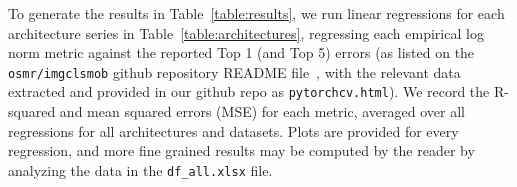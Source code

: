 To generate the results in Table~\ref{table:results}, we run linear regressions for each architecture series in Table~\ref{table:architectures}, regressing each empirical log norm metric against the reported Top 1 (and Top 5) errors (as listed on the \texttt{osmr/imgclsmob} github repository README file~\cite{osmr}, with the relevant data extracted and provided in our github repo as \texttt{pytorchcv.html}).
We record the R-squared and mean squared errors (MSE) for each metric, averaged over all regressions for all architectures and datasets.
Plots are provided for every regression, and more fine grained results may be computed by the reader by analyzing the data in the \texttt{df\_all.xlsx} file.

 

